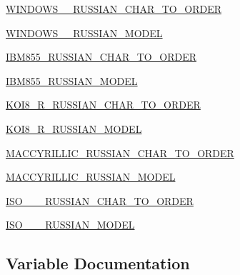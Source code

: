 \begin{DoxyCompactItemize}
\hyperlink{namespacepip_1_1__vendor_1_1chardet_1_1langrussianmodel_a490808c7533955a85e943a085f241d82}{W\+I\+N\+D\+O\+W\+S\+\_\+\_\+\+R\+U\+S\+S\+I\+A\+N\+\_\+\+C\+H\+A\+R\+\_\+\+T\+O\+\_\+\+O\+R\+D\+ER}
\item 
\hyperlink{namespacepip_1_1__vendor_1_1chardet_1_1langrussianmodel_a47b274ffcf08036c54d169769eef8f53}{W\+I\+N\+D\+O\+W\+S\+\_\+\_\+\+R\+U\+S\+S\+I\+A\+N\+\_\+\+M\+O\+D\+EL}
\item 
\hyperlink{namespacepip_1_1__vendor_1_1chardet_1_1langrussianmodel_abaf04aa4a129cfa79f6e861ce6c12495}{I\+B\+M855\+\_\+\+R\+U\+S\+S\+I\+A\+N\+\_\+\+C\+H\+A\+R\+\_\+\+T\+O\+\_\+\+O\+R\+D\+ER}
\item 
\hyperlink{namespacepip_1_1__vendor_1_1chardet_1_1langrussianmodel_afe657a6742c9de468885e84d48a5eba6}{I\+B\+M855\+\_\+\+R\+U\+S\+S\+I\+A\+N\+\_\+\+M\+O\+D\+EL}
\item 
\hyperlink{namespacepip_1_1__vendor_1_1chardet_1_1langrussianmodel_a0af07d610fb050d06f291e883e634cd6}{K\+O\+I8\+\_\+\+R\+\_\+\+R\+U\+S\+S\+I\+A\+N\+\_\+\+C\+H\+A\+R\+\_\+\+T\+O\+\_\+\+O\+R\+D\+ER}
\item 
\hyperlink{namespacepip_1_1__vendor_1_1chardet_1_1langrussianmodel_a1c2e7436da419331b55fb1342e8c2f9e}{K\+O\+I8\+\_\+\+R\+\_\+\+R\+U\+S\+S\+I\+A\+N\+\_\+\+M\+O\+D\+EL}
\item 
\hyperlink{namespacepip_1_1__vendor_1_1chardet_1_1langrussianmodel_abc1844f234cd4aa9d0c0af2c1d122383}{M\+A\+C\+C\+Y\+R\+I\+L\+L\+I\+C\+\_\+\+R\+U\+S\+S\+I\+A\+N\+\_\+\+C\+H\+A\+R\+\_\+\+T\+O\+\_\+\+O\+R\+D\+ER}
\item 
\hyperlink{namespacepip_1_1__vendor_1_1chardet_1_1langrussianmodel_a991ac832cd5c29f4759bdd802111c706}{M\+A\+C\+C\+Y\+R\+I\+L\+L\+I\+C\+\_\+\+R\+U\+S\+S\+I\+A\+N\+\_\+\+M\+O\+D\+EL}
\item 
\hyperlink{namespacepip_1_1__vendor_1_1chardet_1_1langrussianmodel_a3b6ae9eb7e782728ec49016e07184803}{I\+S\+O\+\_\+\_\+\_\+\+R\+U\+S\+S\+I\+A\+N\+\_\+\+C\+H\+A\+R\+\_\+\+T\+O\+\_\+\+O\+R\+D\+ER}
\item 
\hyperlink{namespacepip_1_1__vendor_1_1chardet_1_1langrussianmodel_a18ba4133763d5b95358543e74e41a111}{I\+S\+O\+\_\+\_\+\_\+\+R\+U\+S\+S\+I\+A\+N\+\_\+\+M\+O\+D\+EL}
\end{DoxyCompactItemize}


\subsection{Variable Documentation}
\mbox{\label{namespacepip_1_1__vendor_1_1chardet_1_1langrussianmodel_affb0aae2503d489aa71b91acbe45418b}} 
